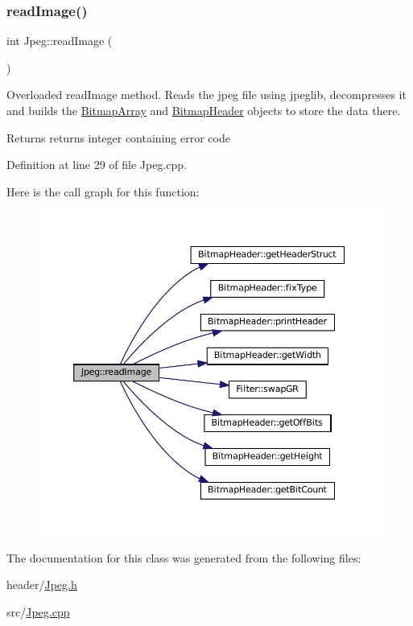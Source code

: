 \subsubsection{\texorpdfstring{readImage()}{readImage()}}
{\footnotesize\ttfamily int Jpeg\+::read\+Image (\begin{DoxyParamCaption}{ }\end{DoxyParamCaption})}



Overloaded read\+Image method. Reads the jpeg file using jpeglib, decompresses it and builds the \mbox{\hyperlink{classBitmapArray}{Bitmap\+Array}} and \mbox{\hyperlink{classBitmapHeader}{Bitmap\+Header}} objects to store the data there. 

\begin{DoxyReturn}{Returns}
returns integer containing error code 
\end{DoxyReturn}


Definition at line 29 of file Jpeg.\+cpp.

Here is the call graph for this function\+:\nopagebreak
\begin{figure}[H]
\begin{center}
\leavevmode
\includegraphics[width=350pt]{classJpeg_a80db9e22efc544e32145b6743b2b407c_cgraph}
\end{center}
\end{figure}


The documentation for this class was generated from the following files\+:\begin{DoxyCompactItemize}
\item 
header/\mbox{\hyperlink{Jpeg_8h}{Jpeg.\+h}}\item 
src/\mbox{\hyperlink{Jpeg_8cpp}{Jpeg.\+cpp}}\end{DoxyCompactItemize}
